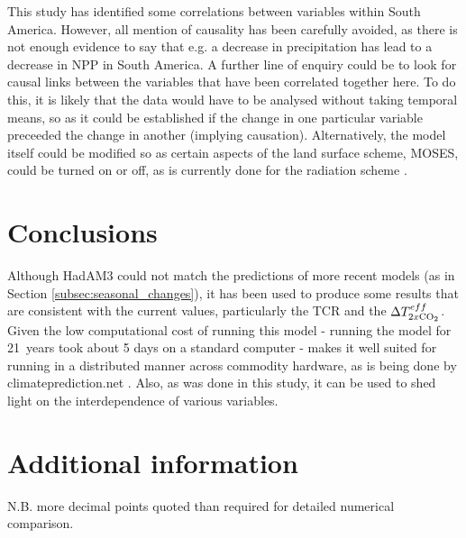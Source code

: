\documentclass{article}
\begin{document}
This study has identified some correlations between variables within South America. However, all mention of causality has been carefully avoided, as there is not enough evidence to say that e.g. a decrease in precipitation has lead to a decrease in NPP in South America. A further line of enquiry could be to look for causal links between the variables that have been correlated together here. To do this, it is likely that the data would have to be analysed without taking temporal means, so as it could be established if the change in one particular variable preceeded the change in another (implying causation). Alternatively, the model itself could be modified so as certain aspects of the land surface scheme, MOSES, could be turned on or off, as is currently done for the radiation scheme \parencite{pope2000impact}.

\section{Conclusions}

Although HadAM3 could not match the predictions of more recent models (as in Section \ref{subsec:seasonal_changes}), it has been used to produce some results that are consistent with the current values, particularly the TCR and the $\Delta T^{eff}_{2x\ce{CO2}}$. Given the low computational cost of running this model - running the model for \SI{21}{years} took about 5 days on a standard computer - makes it well suited for running in a distributed manner across commodity hardware,  as is  being done by climateprediction.net \parencite{stainforth2005uncertainty}. Also, as was done in this study, it can be used to shed light on the interdependence of various variables.

\printbibliography
\appendix 

\section{Additional information}

N.B. more decimal points quoted than required for detailed numerical comparison.
\end{document}
